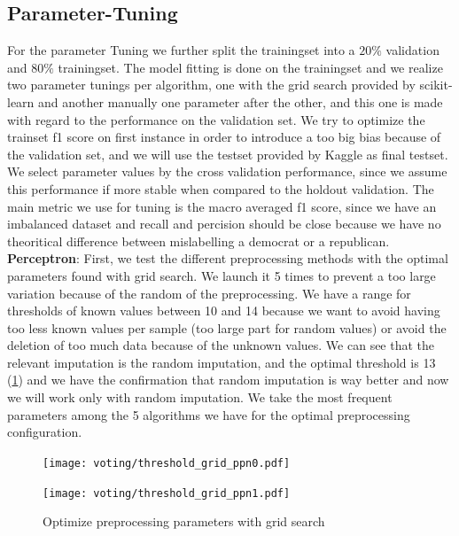 \documentclass[11pt]{article}
\begin{document}
\subsection{Parameter-Tuning}

For the parameter Tuning we further split the trainingset into a $20\%$ validation and $80\%$ trainingset. The model fitting is done on the trainingset and we realize two parameter tunings per algorithm, one with the grid search provided by scikit-learn and another manually one parameter after the other, and this one is made with regard to the performance on the validation set. We try to optimize the trainset f1 score on first instance in order to introduce a too big bias because of the validation set, and we will use the testset provided by Kaggle as final testset. We select parameter values by the cross validation performance, since we assume this performance if more stable when compared to the holdout validation. The main metric we use for tuning is the macro averaged f1 score, since we have an imbalanced dataset and recall and percision should be close because we have no theoritical difference between mislabelling a democrat or a republican.
%
\newline
\textbf{Perceptron}: First, we test the different preprocessing methods with the optimal parameters found with grid search. We launch it 5 times to prevent a too large variation because of the random of the preprocessing. We have a range for thresholds of known values between 10 and 14 because we want to avoid having too less known values per sample (too large part for random values) or avoid the deletion of too much data because of the unknown values.
We can see that the relevant imputation is the random imputation, and the optimal threshold is 13 (\ref{votingfig_fig1}) and we have the confirmation that random imputation is way better and now we will work only with random imputation. We take the most frequent parameters among the 5 algorithms we have for the optimal preprocessing configuration.

\begin{figure}
\centering
\begin{minipage}[t]{0.3\textwidth}
\texttt{[image: voting/threshold\_grid\_ppn0.pdf]}
\end{minipage}
\begin{minipage}[t]{0.3\textwidth}
\texttt{[image: voting/threshold\_grid\_ppn1.pdf]}
\end{minipage}
   \caption{Optimize preprocessing parameters with grid search}
\label{votingfig_fig1}
\end{figure}
\end{document}
